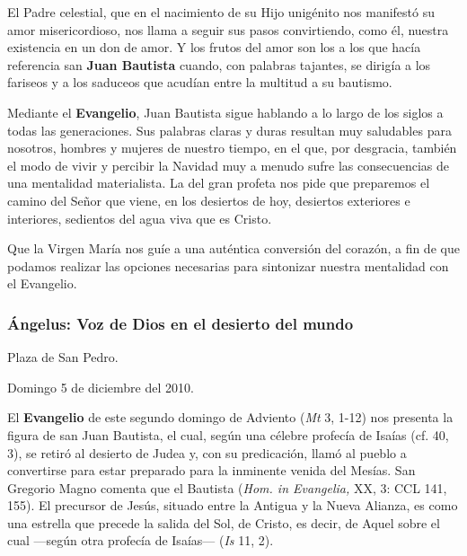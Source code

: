 \begin{body}
\begin{body}
El Padre celestial, que en el nacimiento de su Hijo unigénito nos manifestó su amor misericordioso, nos llama a seguir sus pasos convirtiendo, como él, nuestra existencia en un don de amor. Y los frutos del amor son los  a los que hacía referencia san \textbf{Juan Bautista} cuando, con palabras tajantes, se dirigía a los fariseos y a los saduceos que acudían entre la multitud a su bautismo.

Mediante el \textbf{Evangelio}, Juan Bautista sigue hablando a lo largo de los siglos a todas las generaciones. Sus palabras claras y duras resultan muy saludables para nosotros, hombres y mujeres de nuestro tiempo, en el que, por desgracia, también el modo de vivir y percibir la Navidad muy a menudo sufre las consecuencias de una mentalidad materialista. La  del gran profeta nos pide que preparemos el camino del Señor que viene, en los desiertos de hoy, desiertos exteriores e interiores, sedientos del agua viva que es Cristo.

Que la Virgen María nos guíe a una auténtica conversión del corazón, a fin de que podamos realizar las opciones necesarias para sintonizar nuestra mentalidad con el Evangelio.

\subsubsection{Ángelus: Voz de Dios en el desierto del mundo}

Plaza de San Pedro.

Domingo 5 de diciembre del 2010.

El \textbf{Evangelio} de este segundo domingo de Adviento (\emph{Mt} 3, 1-12) nos presenta la figura de san Juan Bautista, el cual, según una célebre profecía de Isaías (cf. 40, 3), se retiró al desierto de Judea y, con su predicación, llamó al pueblo a convertirse para estar preparado para la inminente venida del Mesías. San Gregorio Magno comenta que el Bautista  (\emph{Hom. in Evangelia,} XX, 3: CCL 141, 155). El precursor de Jesús, situado entre la Antigua y la Nueva Alianza, es como una estrella que precede la salida del Sol, de Cristo, es decir, de Aquel sobre el cual ---según otra profecía de Isaías---  (\emph{Is} 11, 2).


\end{body}
\end{body}
